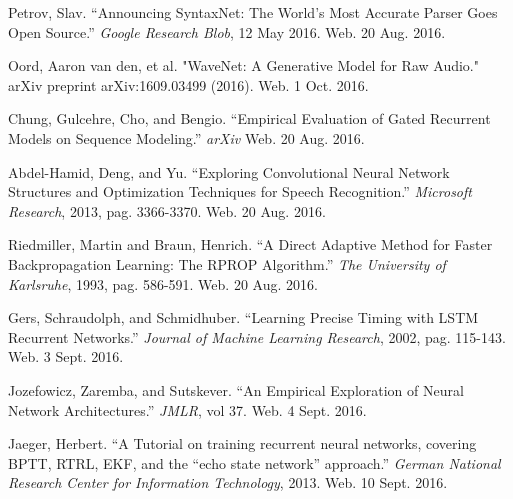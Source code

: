 \documentclass{article}
\begin{document}
\begin{thebibliography}{9}
		Petrov, Slav. ``Announcing SyntaxNet: The World's Most Accurate Parser
		Goes Open Source.'' \textit{Google Research Blob}, 12 May 2016. Web. 20
		Aug. 2016.

		Oord, Aaron van den, et al. "WaveNet: A Generative Model for Raw Audio."
		arXiv preprint arXiv:1609.03499 (2016). Web. 1 Oct. 2016.

		Chung, Gulcehre, Cho, and Bengio. ``Empirical Evaluation of Gated
		Recurrent Models on Sequence Modeling.'' \textit{arXiv} Web. 20 Aug.
		2016.

		Abdel-Hamid, Deng, and Yu. ``Exploring Convolutional Neural Network
		Structures and Optimization Techniques for Speech Recognition.''
		\textit{Microsoft Research}, 2013, pag. 3366-3370. Web. 20 Aug. 2016.

		Riedmiller, Martin and Braun, Henrich. ``A Direct Adaptive Method for
		Faster Backpropagation Learning: The RPROP Algorithm.'' \textit{The
		University of Karlsruhe}, 1993, pag. 586-591. Web. 20 Aug. 2016.

		Gers, Schraudolph, and Schmidhuber. ``Learning Precise Timing with LSTM
		Recurrent Networks.'' \textit{Journal of Machine Learning Research},
		2002, pag. 115-143. Web. 3 Sept. 2016.

		Jozefowicz, Zaremba, and Sutskever. ``An Empirical Exploration of Neural
		Network Architectures.'' \textit{JMLR}, vol 37. Web. 4 Sept. 2016.

		Jaeger, Herbert. ``A Tutorial on training recurrent neural networks,
		covering BPTT, RTRL, EKF, and the ``echo state network''
		approach.'' \textit{German National Research Center for Information
		Technology}, 2013. Web. 10 Sept. 2016.

\end{thebibliography}
\end{document}
